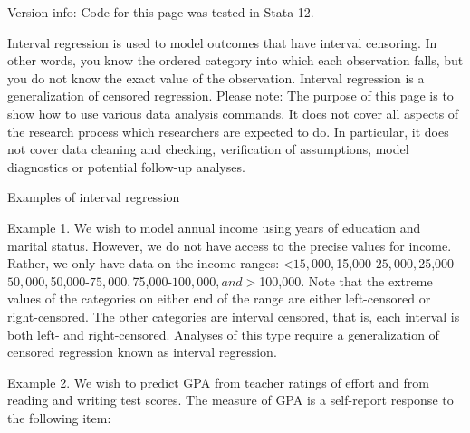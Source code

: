 Version info: Code for this page was tested in Stata 12.

Interval regression is used to model outcomes that have interval censoring.  In other words, you know the ordered category into which each observation falls, but you do not know the exact value of the observation.  Interval regression is a generalization of censored regression.
Please note: The purpose of this page is to show how to use various data analysis commands.  It does not cover all aspects of the research process which researchers are expected to do.  In particular, it does not cover data cleaning and checking, verification of assumptions, model diagnostics or potential follow-up analyses.

Examples of interval regression

Example 1.  We wish to model annual income using years of education and marital status.  However, we do not have access to the precise values for income.  Rather, we only have data on the income ranges: <$15,000, $15,000-$25,000, $25,000-$50,000, $50,000-$75,000, $75,000-$100,000, and >$100,000.  Note that the extreme values of the categories on either end of the range are either left-censored or right-censored.  The other categories are interval censored, that is, each interval is both left- and right-censored.  Analyses of this type require a generalization of censored regression known as interval regression.

Example 2.  We wish to predict GPA from teacher ratings of effort and from reading and writing test scores.  The measure of GPA is a self-report response to the following item:
